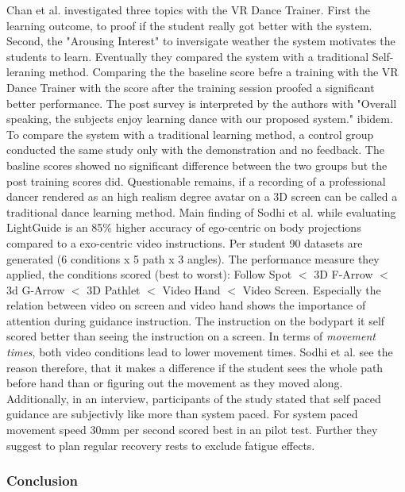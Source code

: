Chan et al. investigated three topics with the VR Dance Trainer. First the learning outcome, to proof if the student really got better with the system. Second, the "Arousing Interest" to inversigate weather the system motivates the students to learn. Eventually they compared the system with a traditional Self-leraning method. Comparing the the baseline score befre a training with the VR Dance Trainer with the score after the training session proofed a significant better performance. The post survey is interpreted by the authors with "Overall speaking, the subjects enjoy learning dance with our proposed system." ibidem. To compare the system with a traditional learning method, a control group conducted the same study only with the demonstration and no feedback. The basline scores showed no significant difference between the two groups but the post training scores did. Questionable remains, if a recording of a professional dancer rendered as an high realism degree avatar on a 3D screen can be called a traditional dance learning method.
Main finding of Sodhi et al. while evaluating LightGuide is an 85\% higher accuracy of ego-centric on body projections compared to a exo-centric video instructions.
Per student 90 datasets are generated (6 conditions x 5 path x 3 angles). The performance measure they applied, the conditions scored (best to worst): Follow Spot $<$ 3D F-Arrow $<$ 3d G-Arrow $<$ 3D Pathlet $<$ Video Hand $<$ Video Screen. Especially the relation between video on screen and video hand shows the importance of attention during guidance instruction. The instruction on the bodypart it self scored better than seeing the instruction on a screen. In terms of \textit{movement times}, both video conditions lead to lower movement times. Sodhi et al. see the reason therefore, that it makes a difference if the student sees the whole path before hand than or figuring out the movement as they moved along. Additionally, in an interview, participants of the study stated that self paced guidance are subjectivly like more than system paced. For system paced movement speed 30mm per second scored best in an pilot test. Further they suggest to plan regular recovery rests to exclude fatigue effects.
\subsubsection{Conclusion}






